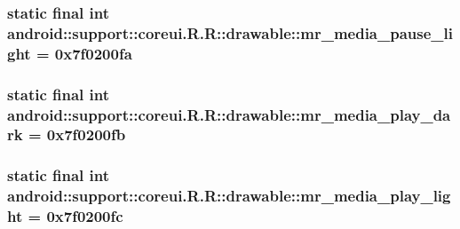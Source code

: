 \hypertarget{classandroid_1_1support_1_1coreui_1_1_r_1_1drawable_6c6544f0c656531da1a8006f413bfb2e}{
\subsubsection[{mr\_\-media\_\-pause\_\-light}]{\setlength{\rightskip}{0pt plus 5cm}static final int android::support::coreui.R.R::drawable::mr\_\-media\_\-pause\_\-light = 0x7f0200fa}}
\label{classandroid_1_1support_1_1coreui_1_1_r_1_1drawable_6c6544f0c656531da1a8006f413bfb2e}


\hypertarget{classandroid_1_1support_1_1coreui_1_1_r_1_1drawable_874359ed0a245db638f46317ec1681b3}{
\subsubsection[{mr\_\-media\_\-play\_\-dark}]{\setlength{\rightskip}{0pt plus 5cm}static final int android::support::coreui.R.R::drawable::mr\_\-media\_\-play\_\-dark = 0x7f0200fb}}
\label{classandroid_1_1support_1_1coreui_1_1_r_1_1drawable_874359ed0a245db638f46317ec1681b3}


\hypertarget{classandroid_1_1support_1_1coreui_1_1_r_1_1drawable_3827e56efa1e422b861d3ef8833150ad}{
\subsubsection[{mr\_\-media\_\-play\_\-light}]{\setlength{\rightskip}{0pt plus 5cm}static final int android::support::coreui.R.R::drawable::mr\_\-media\_\-play\_\-light = 0x7f0200fc}}
\label{classandroid_1_1support_1_1coreui_1_1_r_1_1drawable_3827e56efa1e422b861d3ef8833150ad}


